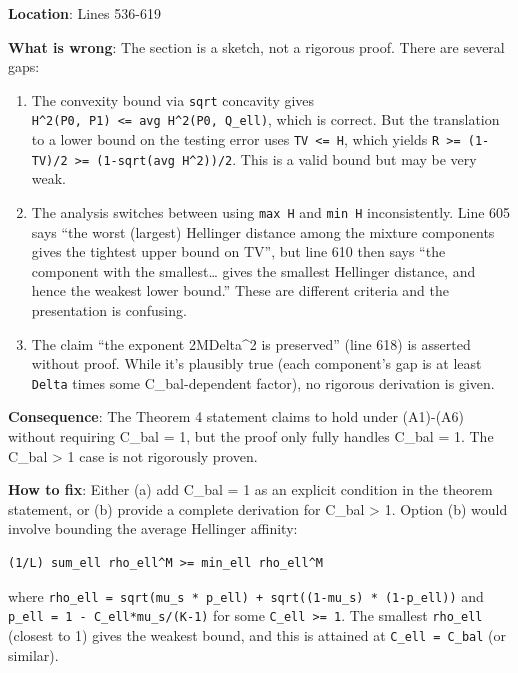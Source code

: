 \documentclass[
  12pt,
]{ctexart}
\begin{document}
\textbf{Location}: Lines 536-619

\textbf{What is wrong}: The section is a sketch, not a rigorous proof.
There are several gaps:

\begin{enumerate}
\def\labelenumi{\arabic{enumi}.}
\item
  The convexity bound via \texttt{sqrt} concavity gives
  \texttt{H\^{}2(P0,\ P1)\ \textless{}=\ avg\ H\^{}2(P0,\ Q\_ell)},
  which is correct. But the translation to a lower bound on the testing
  error uses \texttt{TV\ \textless{}=\ H}, which yields
  \texttt{R\ \textgreater{}=\ (1-TV)/2\ \textgreater{}=\ (1-sqrt(avg\ H\^{}2))/2}.
  This is a valid bound but may be very weak.
\item
  The analysis switches between using \texttt{max\ H} and
  \texttt{min\ H} inconsistently. Line 605 says ``the worst (largest)
  Hellinger distance among the mixture components gives the tightest
  upper bound on TV'', but line 610 then says ``the component with the
  smallest\ldots{} gives the smallest Hellinger distance, and hence the
  weakest lower bound.'' These are different criteria and the
  presentation is confusing.
\item
  The claim ``the exponent 2MDelta\^{}2 is preserved'' (line 618) is
  asserted without proof. While it's plausibly true (each component's
  gap is at least \texttt{Delta} times some C\_bal-dependent factor), no
  rigorous derivation is given.
\end{enumerate}

\textbf{Consequence}: The Theorem 4 statement claims to hold under
(A1)-(A6) without requiring C\_bal = 1, but the proof only fully handles
C\_bal = 1. The C\_bal \textgreater{} 1 case is not rigorously proven.

\textbf{How to fix}: Either (a) add C\_bal = 1 as an explicit condition
in the theorem statement, or (b) provide a complete derivation for
C\_bal \textgreater{} 1. Option (b) would involve bounding the average
Hellinger affinity:

\begin{verbatim}
(1/L) sum_ell rho_ell^M >= min_ell rho_ell^M
\end{verbatim}

where
\texttt{rho\_ell\ =\ sqrt(mu\_s\ *\ p\_ell)\ +\ sqrt((1-mu\_s)\ *\ (1-p\_ell))}
and \texttt{p\_ell\ =\ 1\ -\ C\_ell*mu\_s/(K-1)} for some
\texttt{C\_ell\ \textgreater{}=\ 1}. The smallest \texttt{rho\_ell}
(closest to 1) gives the weakest bound, and this is attained at
\texttt{C\_ell\ =\ C\_bal} (or similar).
\end{document}
